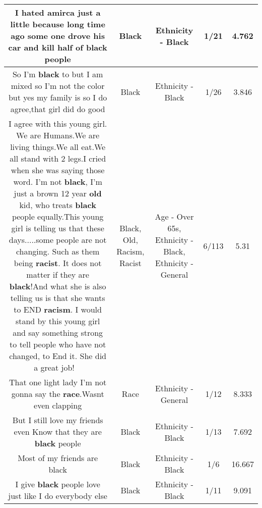 \documentclass[11pt]{article}
\newlength\mylength
\begin{document}
\begin{center}
\begin{longtable}{|C{.65\mylength}|C{.30\mylength}|C{.12\mylength}|C{.12\mylength}|C{.12\mylength}|}
  \small I hated amirca just a little because long time ago some one drove his car and kill half of \textbf{black} people\normalsize   & Black & Ethnicity - Black & 1/21 & 4.762 \\  \hline
  \small So I'm \textbf{black} to but I am mixed so I'm not the color but yes my family is so I do agree,that girl did do good\normalsize   & Black & Ethnicity - Black & 1/26 & 3.846 \\  \hline
  \small I agree with this young girl. We are Humans.We are living things.We all eat.We all stand with 2 legs.I cried when she was saying those word. I'm not \textbf{black}, I'm just a brown 12 year \textbf{old} kid, who treats \textbf{black} people equally.This young girl is telling us that these days.....some people are not changing. Such as them being \textbf{racist}. It does not matter if they are \textbf{black}!And what she is also telling us is that she wants to END \textbf{racism}. I would stand by this young girl and say something strong to tell people who have not changed, to End it.  She did a great job! 👍🏻\normalsize   & Black, Old, Racism, Racist & Age - Over 65s, Ethnicity - Black, Ethnicity - General & 6/113 & 5.31 \\  \hline
  \small That one light lady I'm not gonna say the \textbf{race}.Wasnt even clapping\normalsize   & Race & Ethnicity - General & 1/12 & 8.333 \\  \hline
  \small But I still love my friends even Know that they are \textbf{black} people\normalsize   & Black & Ethnicity - Black & 1/13 & 7.692 \\  \hline
  \small Most of my friends are black\normalsize   & Black & Ethnicity - Black & 1/6 & 16.667 \\  \hline
  \small I give \textbf{black} people love just like I do everybody else\normalsize   & Black & Ethnicity - Black & 1/11 & 9.091 \\  \hline

\end{longtable}
\end{center}
\end{document}
